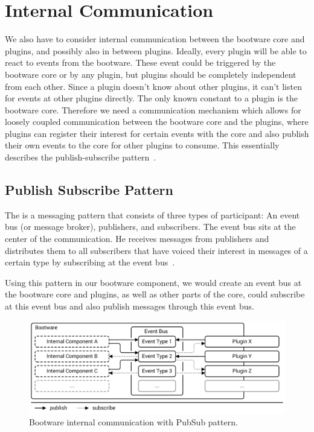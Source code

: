 \section{Internal Communication}
\label{design:internalcomm}

We also have to consider internal communication between the bootware core and plugins, and possibly also in between plugins.
Ideally, every plugin will be able to react to events from the bootware.
These event could be triggered by the bootware core or by any plugin, but plugins should be completely independent from each other.
Since a plugin doesn't know about other plugins, it can't listen for events at other plugins directly.
The only known constant to a plugin is the bootware core.
Therefore we need a communication mechanism which allows for loosely coupled communication between the bootware core and the plugins, where plugins can register their interest for certain events with the core and also publish their own events to the core for other plugins to consume.
This essentially describes the publish-subscribe pattern~\autocite{pubsub}.

\subsection{Publish Subscribe Pattern}

The  is a messaging pattern that consists of three types of participant: An event bus (or message broker), publishers, and subscribers.
The event bus sits at the center of the communication.
He receives messages from publishers and distributes them to all subscribers that have voiced their interest in messages of a certain type by subscribing at the event bus~\autocite{pubsub}.

Using this pattern in our bootware component, we would create an event bus at the bootware core and plugins, as well as other parts of the core, could subscribe at this event bus and also publish messages through this event bus.

\begin{figure}[!htbp]
	\centering
	\includegraphics[resolution=600]{design/assets/pubsub}
	\caption{Bootware internal communication with PubSub pattern.}
	\label{image:pubsub}
\end{figure}

